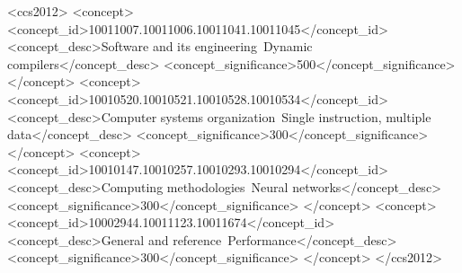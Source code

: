 \documentclass[manuscript,screen,review]{acmart}
\theoremstyle{indenteditalic}
\begin{document}
\begin{CCSXML}
	<ccs2012>
	<concept>
		<concept_id>10011007.10011006.10011041.10011045</concept_id>
		<concept_desc>Software and its engineering~Dynamic compilers</concept_desc>
		<concept_significance>500</concept_significance>
		</concept>
	<concept>
		<concept_id>10010520.10010521.10010528.10010534</concept_id>
		<concept_desc>Computer systems organization~Single instruction, multiple data</concept_desc>
		<concept_significance>300</concept_significance>
		</concept>
	<concept>
		<concept_id>10010147.10010257.10010293.10010294</concept_id>
		<concept_desc>Computing methodologies~Neural networks</concept_desc>
		<concept_significance>300</concept_significance>
		</concept>
	<concept>
		<concept_id>10002944.10011123.10011674</concept_id>
		<concept_desc>General and reference~Performance</concept_desc>
		<concept_significance>300</concept_significance>
		</concept>
	</ccs2012>
\end{CCSXML}




\let\CombinedDocumentRef\ref
\def\PaperTotPagesLabel{TotPages}
\def\ref#1{%
  \def\CurrentReferenceLabel{#1}%
  \ifx\CurrentReferenceLabel\PaperTotPagesLabel
    \PaperTotPagesLink
  \else
    \CombinedDocumentRef{#1}%
  \fi}
\maketitle
\let\ref\CombinedDocumentRef
\end{document}
